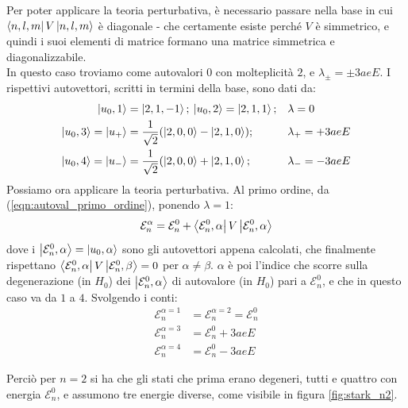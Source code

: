 \documentclass[../../FisicaTeorica.tex]{subfiles}
\begin{document}
Per poter applicare la teoria perturbativa, è necessario passare nella base in cui $\Bra{n,l,m}V\Ket{n,l,m}$ è diagonale - che certamente esiste perché $V$ è simmetrico, e quindi i suoi elementi di matrice formano una matrice simmetrica e diagonalizzabile.\\
In questo caso troviamo come autovalori $0$ con molteplicità $2$, e $\lambda_\pm = \pm 3aeE$. I rispettivi autovettori, scritti in termini della base, sono dati da:
\begin{align*}
\Ket{u_0,1} &= \Ket{2,1,-1}; \> \Ket{u_0,2}= \Ket{2,1,1}; && \lambda = 0\\
\Ket{u_0,3}=\Ket{u_+} &= \frac{1}{\sqrt{2}}(\Ket{2,0,0}-\Ket{2,1,0}); && \lambda_+ = +3aeE\\
\Ket{u_0,4}=\Ket{u_-} &= \frac{1}{\sqrt{2}}(\Ket{2,0,0}+\Ket{2,1,0}; && \lambda_- = -3aeE
\end{align*}
Possiamo ora applicare la teoria perturbativa. Al primo ordine, da (\ref{eqn:autoval_primo_ordine}), ponendo $\lambda=1$:
\begin{align*}
\mathcal{E}_n^\alpha = \mathcal{E}_n^0 + \Bra{\mathcal{E}_n^0,\alpha}V \Ket{\mathcal{E}_n^0,\alpha}
\end{align*}
dove i $\Ket{\mathcal{E}_n^0,\alpha} = \Ket{u_0, \alpha}$ sono gli autovettori appena calcolati, che finalmente rispettano $\Bra{\mathcal{E}_n^0,\alpha}V\Ket{\mathcal{E}_n^0, \beta} = 0$ per $\alpha\neq \beta$. $\alpha$ è poi l'indice che scorre sulla degenerazione (in $H_0$) dei $\Ket{\mathcal{E}_n^0, \alpha}$ di autovalore (in $H_0$) pari a $\mathcal{E}_n^0$, e che in questo caso va da $1$ a $4$. Svolgendo i conti:
\begin{align*}
\mathcal{E}_n^{\alpha=1} &= \mathcal{E}_n^{\alpha=2} = \mathcal{E}_n^0\\
\mathcal{E}_n^{\alpha=3} &= \mathcal{E}_n^0+3aeE\\
\mathcal{E}_n^{\alpha=4} &= \mathcal{E}_n^0 - 3aeE
\end{align*}

Perciò per $n=2$ si ha che gli stati che prima erano degeneri, tutti e quattro con energia $\mathcal{E}_n^0$,   e assumono tre energie diverse, come visibile in figura \ref{fig:stark_n2}.
\end{document}
